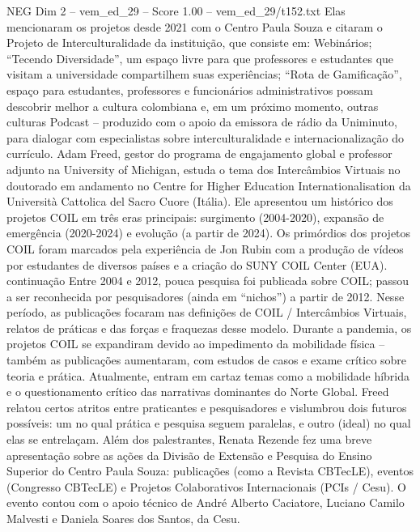\begin{textsample}{NEG Dim 2 – vem\_ed\_29 – Score 1.00 – vem\_ed\_29/t152.txt}
Elas mencionaram os projetos desde 2021 com o Centro Paula Souza e citaram o Projeto de Interculturalidade da instituição, que consiste em: Webinários; “Tecendo Diversidade”, um espaço livre para que professores e estudantes que visitam a universidade compartilhem suas experiências; “Rota de Gamificação”, espaço para estudantes, professores e funcionários administrativos possam descobrir melhor a cultura colombiana e, em um próximo momento, outras culturas Podcast – produzido com o apoio da emissora de rádio da Uniminuto, para dialogar com especialistas sobre interculturalidade e internacionalização do currículo.
Adam Freed, gestor do programa de engajamento global e professor adjunto na University of Michigan, estuda o tema dos Intercâmbios Virtuais no doutorado em andamento no Centre for Higher Education Internationalisation da Università Cattolica del Sacro Cuore (Itália).
Ele apresentou um histórico dos projetos COIL em três eras principais: surgimento (2004-2020), expansão de emergência (2020-2024) e evolução (a partir de 2024).
Os primórdios dos projetos COIL foram marcados pela experiência de Jon Rubin com a produção de vídeos por estudantes de diversos países e a criação do SUNY COIL Center (EUA). continuação Entre 2004 e 2012, pouca pesquisa foi publicada sobre COIL; passou a ser reconhecida por pesquisadores (ainda em “nichos”) a partir de 2012.
Nesse período, as publicações focaram nas definições de COIL / Intercâmbios Virtuais, relatos de práticas e das forças e fraquezas desse modelo.
Durante a pandemia, os projetos COIL se expandiram devido ao impedimento da mobilidade física – também as publicações aumentaram, com estudos de casos e exame crítico sobre teoria e prática.
Atualmente, entram em cartaz temas como a mobilidade híbrida e o questionamento crítico das narrativas dominantes do Norte Global.
Freed relatou certos atritos entre praticantes e pesquisadores e vislumbrou dois futuros possíveis: um no qual prática e pesquisa seguem paralelas, e outro (ideal) no qual elas se entrelaçam.
Além dos palestrantes, Renata Rezende fez uma breve apresentação sobre as ações da Divisão de Extensão e Pesquisa do Ensino Superior do Centro Paula Souza: publicações (como a Revista CBTecLE), eventos (Congresso CBTecLE) e Projetos Colaborativos Internacionais (PCIs / Cesu).
O evento contou com o apoio técnico de André Alberto Caciatore, Luciano Camilo Malvesti e Daniela Soares dos Santos, da Cesu.

\end{textsample}
